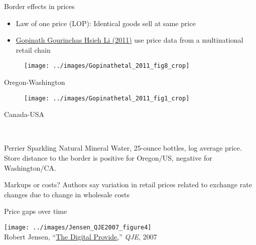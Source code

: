 \documentclass[10pt,notes=hide]{beamer}
\begin{document}
\begin{frame}{Border effects in prices}
\begin{itemize}
	\item Law of one price (LOP): Identical goods sell at same price
	\item \href{https://www.aeaweb.org/articles?id=10.1257/aer.101.6.2450}{Gopinath Gourinchas Hsieh Li (2011)} use price data from a multinational retail chain
\end{itemize}
	\begin{minipage}{.45\textwidth} \begin{center}\begin{figure} \texttt{[image: ../images/Gopinathetal\_2011\_fig8\_crop]}\end{figure} Oregon-Washington \end{center} \end{minipage}
	\begin{minipage}{.45\textwidth} \begin{center}\begin{figure} \texttt{[image: ../images/Gopinathetal\_2011\_fig1\_crop]}\end{figure} Canada-USA \end{center} \end{minipage} \\ \vspace{0.1in}
	{\scriptsize Perrier Sparkling Natural Mineral Water, 25-ounce bottles, log average price. Store distance to the border is positive for Oregon/US, negative for Washington/CA. \par }
Markups or costs? Authors say variation in retail prices related to exchange rate changes due to change in wholesale costs
\end{frame}
\begin{frame}{Price gaps over time}
\begin{center}\texttt{[image: ../images/Jensen\_QJE2007\_figure4]} \\ \footnotesize{Robert Jensen, ``\href{http://qje.oxfordjournals.org/content/122/3/879.abstract}{The Digital Provide},'' \textit{QJE}, 2007}\end{center}
\end{frame}
\end{document}
